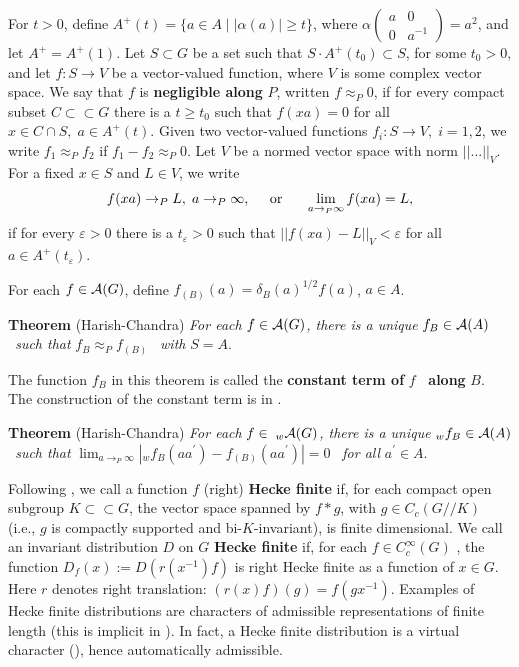 \documentclass[11pt, a4paper]{article}
\begin{document}
For $t>0$, define $A^{+}(t)=\{a\in A\;|\;|\alpha (a)|\geq t\}$, where $%
\alpha \left( 
\begin{array}{cc}
a & 0 \\ 
0 & a^{-1}
\end{array}
\right) =a^2$, and let $A^{+}=A^{+}(1)$. Let $S\subset G$ be a set such that 
$S\cdot A^{+}(t_0)\subset S$, for some $t_0>0$, and let $f:S\rightarrow V$
be a vector-valued function, where $V$ is some complex vector space. We say
that $f$ is {\bf negligible along} $P$, written $f\approx _P0$, if for every
compact subset $C\subset \subset G$ there is a $t\geq t_0$ such that $%
f(xa)=0$ for all $x\in C\cap S,\;a\in A^{+}(t)$. Given two vector-valued
functions $f_i:S\rightarrow V,\;i=1,2$, we write $f_1\approx _Pf_2$ if $%
f_1-f_2\approx _P0$. Let $V$ be a normed vector space with norm $||...||_V$.
For a fixed $x\in S$ and $L\in V$, we write
\[
f(xa)\rightarrow _PL,\;a\rightarrow _P\infty ,\;\;\;\;\;{\rm or}\;\;\;\;\;\;\lim
_{a\rightarrow _P\infty }f(xa)=L,
\]
if for every $\varepsilon >0$ there is a $t_\varepsilon >0$ such that $%
||f(xa)-L||_V<\varepsilon $ for all $a\in A^{+}(t_\varepsilon )$.

For each $f\in {\cal A}(G)$, define $f_{(B)}(a)=\delta _B(a)^{1/2}f(a)$, $%
a\in A$.

{\bf Theorem} (Harish-Chandra) {\em For each }$f\in {\cal A}(G)${\em , there
is a unique }$f_B\in {\cal A}(A)${\em \ such that }$f_B\approx _Pf_{(B)}$%
{\em \ with }$S=A$.

The function $f_B$ in this theorem is called the {\bf constant term of }$f$%
{\bf \ along }$B$. The construction of the constant term is in \cite[\S 2.6]{S}.

{\bf Theorem} (Harish-Chandra) {\em For each }$f\in \;_w{\cal A}(G)${\em ,
there is a unique }$_wf_B\in {\cal A}(A)${\em \ such that }$\lim
_{a\rightarrow _P\infty }|_wf_B(aa^{\prime })-f_{(B)}(aa^{\prime })|=0${\em %
\ for all }$a^{\prime }\in A$.

Following \cite[\S 1.10]{S}, we call a function $f$ (right) {\bf Hecke finite%
} if, for each compact open subgroup $K\subset \subset G$, the vector space
spanned by $f*g$, with $g\in C_c(G//K)$ (i.e., $g$ is compactly supported
and bi-$K$-invariant), is finite dimensional. We call an invariant
distribution $D$ on $G$ {\bf Hecke finite} if, for each $f\in C_c^\infty (G)$%
, the function $D_f(x):=D(r(x^{-1})f)$ is right Hecke finite as a function
of $x\in G$. Here $r$ denotes right translation: $(r(x)f)(g)=f(gx^{-1})$.
Examples of Hecke finite distributions are characters of admissible
representations of finite length (this is implicit in \cite[\S 1.11]{S}). In
fact, a Hecke finite distribution is a virtual character (\cite[\S 3]{J}),
hence automatically admissible.
\end{document}
